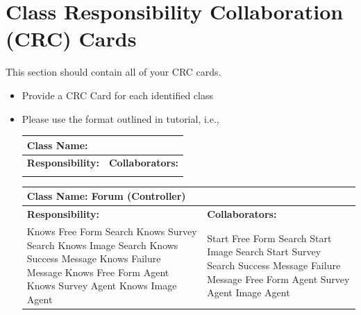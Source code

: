 \documentclass[]{article}
\begin{document}

	
\section{Class Responsibility Collaboration (CRC) Cards}
\label{sec:class_responsibility_collaboration_crc_cards}
This section should contain all of your CRC cards.

\begin{itemize}
	\item Provide a CRC Card for each identified class
	\item Please use the format outlined in tutorial, i.e., 
	\begin{table}[ht]
		\centering
		\begin{tabular}{|p{7cm}|p{7cm}|}
		\hline 
		 \multicolumn{2}{|l|}{\textbf{Class Name:}} \\
		\hline
		\textbf{Responsibility:} & \textbf{Collaborators:} \\
		\hline
		\vspace{1in} & \\
		\hline
		\end{tabular}
	\end{table}

	\begin{table}[ht]
		\centering
		\begin{tabular}{|p{7cm}|p{7cm}|}
		\hline 
		 \multicolumn{2}{|l|}{\textbf{Class Name: Forum (Controller)}} \\
		\hline
		\textbf{Responsibility:} & \textbf{Collaborators:} \\
		\hline
		Knows Free Form Search \newline
		Knows Survey Search \newline
		Knows Image Search \newline
		Knows Success Message \newline
		Knows Failure Message \newline
		Knows Free Form Agent \newline
		Knows Survey Agent \newline
		Knows Image Agent & 		
		Start Free Form Search \newline
		Start Image Search \newline
		Start Survey Search \newline
		Success Message \newline
		Failure Message \newline
		Free Form Agent \newline
		Survey Agent \newline
		Image Agent \\
		\hline
		\end{tabular}
	\end{table}	
	

\end{itemize}
\end{document}

